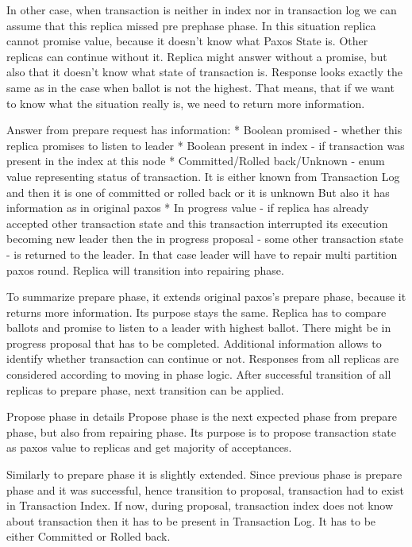 In other case, when transaction is neither in index nor in transaction log we can assume that this replica missed pre prephase phase. In this situation replica cannot promise value, because it doesn’t know what Paxos State is. Other replicas can continue without it. Replica might answer without a promise, but also that it doesn’t know what state of transaction is. Response looks exactly the same as in the case when ballot is not the highest. That means, that if we want to know what the situation really is, we need to return more information.


Answer from prepare request has information:
* Boolean promised - whether this replica promises to listen to leader
* Boolean present in index - if transaction was present in the index at this node
* Committed/Rolled back/Unknown - enum value representing status of transaction. It is either known from Transaction Log and then it is one of committed or rolled back or it is unknown
But also it has information as in original paxos
* In progress value - if replica has already accepted other transaction state and this transaction interrupted its execution becoming new leader then the in progress proposal - some other transaction state - is returned to the leader. In that case leader will have to repair multi partition paxos round. Replica will transition into repairing phase.


To summarize prepare phase, it extends original paxos’s prepare phase, because it returns more information. Its purpose stays the same. Replica has to compare ballots and promise to listen to a leader with highest ballot. There might be in progress proposal that has to be completed. Additional information allows to identify whether transaction can continue or not. Responses from all replicas are considered according to moving in phase logic.
After successful transition of all replicas to prepare phase, next transition can be applied.


        Propose phase in details
Propose phase is the next expected phase from prepare phase, but also from repairing phase. Its purpose is to propose transaction state as paxos value to replicas and get majority of acceptances. 


Similarly to prepare phase it is slightly extended. Since previous phase is prepare phase and it was successful, hence transition to proposal, transaction had to exist in Transaction Index. If now, during proposal,  transaction index does not know about transaction then it has to be present in Transaction Log. It has to be either Committed or Rolled back. 


